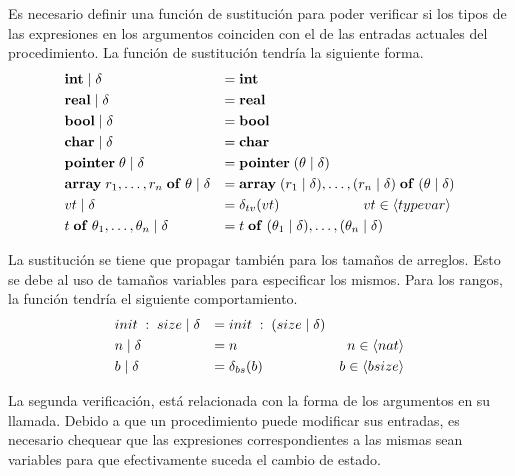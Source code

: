 \documentclass{article}
\begin{document}
Es necesario definir una función de sustitución para poder verificar si los tipos de las expresiones en los argumentos coinciden con el de las entradas actuales del procedimiento.
La función de sustitución tendría la siguiente forma.
\begin{align*}
&\mathbf{int} \mid \delta 
&=&\;
\mathbf{int}
\\
&\mathbf{real} \mid \delta 
&=&\;
\mathbf{real}
\\
&\mathbf{bool} \mid \delta 
&=&\;
\mathbf{bool}
\\
&\mathbf{char} \mid \delta 
&=&\;
\mathbf{char}
\\
&\mathbf{pointer} \; \theta \mid \delta
&=&\;
\mathbf{pointer} \; (\theta \mid \delta)
\\
&\mathbf{array} \; r_1, \ldots, r_n \; \mathbf{of} \; \theta \mid \delta
&=&\;
\mathbf{array} \; (r_1 \mid \delta), \ldots, (r_n \mid \delta) \; \mathbf{of} \; (\theta \mid \delta)
\\
&vt \mid \delta
&=&\;
\delta_{tv}(vt)
\qquad\qquad\qquad vt \in \langle typevar \rangle
\\
&t \; \mathbf{of} \; \theta_1, \ldots, \theta_n \mid \delta
&=&\;
t \; \mathbf{of} \; (\theta_1 \mid \delta), \ldots, (\theta_n \mid \delta)
\end{align*}

La sustitución se tiene que propagar también para los tamaños de arreglos.
Esto se debe al uso de tamaños variables para especificar los mismos.
Para los rangos, la función tendría el siguiente comportamiento.
\begin{align*}
&init \; : \; size \mid \delta
&=&\;
init \; : \; (size \mid \delta)
\\
&n \mid \delta
&=&\;
n
&n \in \langle nat \rangle
\\
&b \mid \delta
&=&\;
\delta_{bs}(b)
&b \in \langle bsize \rangle
\end{align*}



La segunda verificación, está relacionada con la forma de los argumentos en su llamada.
Debido a que un procedimiento puede modificar sus entradas, es necesario chequear que las expresiones correspondientes a las mismas sean variables para que efectivamente suceda el cambio de estado.
\end{document}
